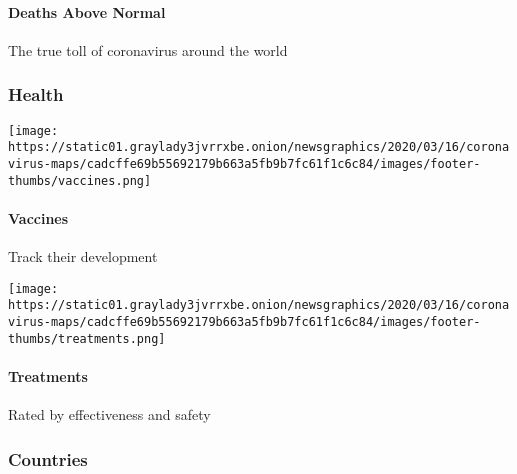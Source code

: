 \hypertarget{deaths-above-normal-1}{%
\paragraph{Deaths Above Normal}\label{deaths-above-normal-1}}

The true toll of coronavirus around the world

\hypertarget{health}{%
\subsubsection{Health}\label{health}}

\href{https://www.nytimes3xbfgragh.onion/interactive/2020/science/coronavirus-vaccine-tracker.html}{}

\texttt{[image: https://static01.graylady3jvrrxbe.onion/newsgraphics/2020/03/16/coronavirus-maps/cadcffe69b55692179b663a5fb9b7fc61f1c6c84/images/footer-thumbs/vaccines.png]}

\hypertarget{vaccines}{%
\paragraph{Vaccines}\label{vaccines}}

Track their development

\href{https://www.nytimes3xbfgragh.onion/interactive/2020/science/coronavirus-drugs-treatments.html}{}

\texttt{[image: https://static01.graylady3jvrrxbe.onion/newsgraphics/2020/03/16/coronavirus-maps/cadcffe69b55692179b663a5fb9b7fc61f1c6c84/images/footer-thumbs/treatments.png]}

\hypertarget{treatments}{%
\paragraph{Treatments}\label{treatments}}

Rated by effectiveness and safety

\hypertarget{countries}{%
\subsubsection{Countries}\label{countries}}

